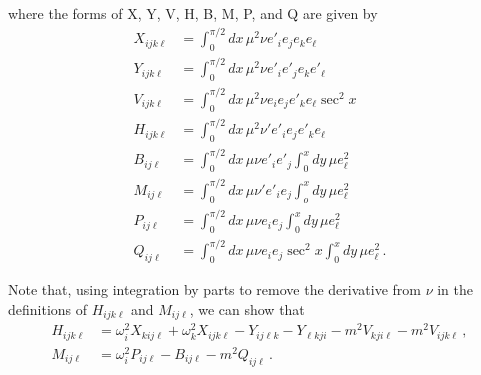 \documentclass[letterpaper,11pt]{article}
\newcommand{\oi}{\omega_i}
\newcommand{\ok}{\omega_k}
\begin{document}
where the forms of X, Y, V, H, B, M, P, and Q are given by
\begin{align}
X_{ijk\ell} &= \int^{\pi/2}_0 dx \, \mu^2 \nu e'_i e_j e_k e_\ell \\
Y_{ijk\ell} &= \int^{\pi/2}_0 dx \, \mu^2 \nu e'_i e'_j e_k e'_\ell \\
V_{ijk\ell} &= \int^{\pi/2}_0 dx \, \mu^2 \nu e_i e_j e'_k e_\ell \sec^2 x \\
H_{ijk\ell} &= \int^{\pi/2}_0 dx \, \mu^2 \nu' e'_i e_j e'_k e_\ell \\
B_{ij\ell} &= \int^{\pi/2}_0 dx \, \mu \nu e'_i e'_j \int^x_0 dy \, \mu e^2_\ell \\
M_{ij\ell} &= \int^{\pi/2}_0 dx \, \mu \nu' e'_i e_j \int^x_o dy \, \mu e_\ell^2 \\
P_{ij\ell} &= \int^{\pi/2}_0 dx \, \mu \nu e_i e_j \int^x_0 dy \, \mu e^2_\ell \\
Q_{ij\ell} &= \int^{\pi/2}_0 dx \, \mu \nu e_i e_j \sec^2 x \int^x_0 dy \, \mu e^2_\ell \, .
\end{align}

Note that, using integration by parts to remove the derivative from $\nu$ in the definitions of $H_{ijk\ell}$ and $M_{ij\ell}$, we can show that
\begin{align}
H_{ijk\ell} &= \oi^2 X_{kij\ell} + \ok^2 X_{ijk\ell} - Y_{ij\ell k}  - Y_{\ell kji}   - m^2 V_{kji\ell} -m^2 V_{ijk\ell} \, , \\
M_{ij\ell} &= \oi^2 P_{ij\ell} - B_{ij\ell} -m^2 Q_{ij\ell} \, .
\end{align}
\end{document}
